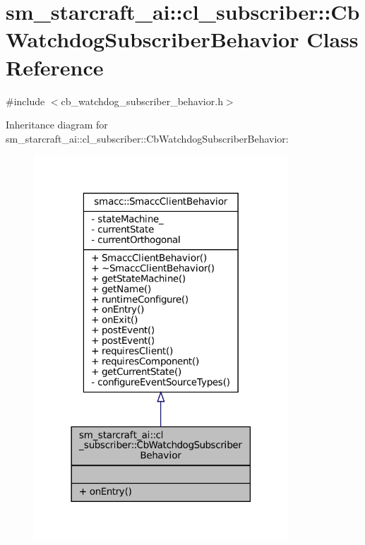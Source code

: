 \hypertarget{classsm__starcraft__ai_1_1cl__subscriber_1_1CbWatchdogSubscriberBehavior}{}\section{sm\+\_\+starcraft\+\_\+ai\+:\+:cl\+\_\+subscriber\+:\+:Cb\+Watchdog\+Subscriber\+Behavior Class Reference}
\label{classsm__starcraft__ai_1_1cl__subscriber_1_1CbWatchdogSubscriberBehavior}


{\ttfamily \#include $<$cb\+\_\+watchdog\+\_\+subscriber\+\_\+behavior.\+h$>$}



Inheritance diagram for sm\+\_\+starcraft\+\_\+ai\+:\+:cl\+\_\+subscriber\+:\+:Cb\+Watchdog\+Subscriber\+Behavior\+:
\nopagebreak
\begin{figure}[H]
\begin{center}
\leavevmode
\includegraphics[width=270pt]{classsm__starcraft__ai_1_1cl__subscriber_1_1CbWatchdogSubscriberBehavior__inherit__graph}
\end{center}
\end{figure}



